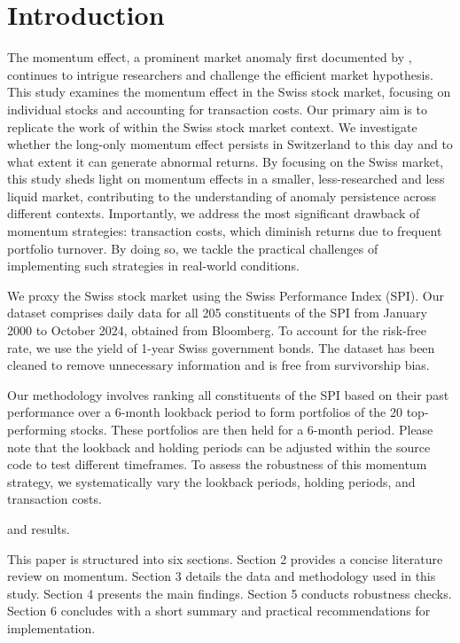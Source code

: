 \documentclass[a4paper,12pt]{article}
\begin{document}
\setcounter{page}{1}
\tableofcontents

\clearpage
\listoftables
\listoffigures
\clearpage


\setcounter{page}{1}
\section{Introduction}
The momentum effect, a prominent market anomaly first documented by \cite{jegatit1993}, continues to intrigue researchers and challenge the efficient market hypothesis. This study examines the momentum effect in the Swiss stock market, focusing on individual stocks and accounting for transaction costs. Our primary aim is to replicate the work of \cite{jegatit1993} within the Swiss stock market context. We investigate whether the long-only momentum effect persists in Switzerland to this day and to what extent it can generate abnormal returns. By focusing on the Swiss market, this study sheds light on momentum effects in a smaller, less-researched and less liquid market, contributing to the understanding of anomaly persistence across different contexts. Importantly, we address the most significant drawback of momentum strategies: transaction costs, which diminish returns due to frequent portfolio turnover. By doing so, we tackle the practical challenges of implementing such strategies in real-world conditions. 

We proxy the Swiss stock market using the Swiss Performance Index (SPI). Our dataset comprises daily data for all 205 constituents of the SPI from January 2000 to October 2024, obtained from Bloomberg. To account for the risk-free rate, we use the yield of 1-year Swiss government bonds. The dataset has been cleaned to remove unnecessary information and is free from survivorship bias. 

Our methodology involves ranking all constituents of the SPI based on their past performance over a 6-month lookback period to form portfolios of the 20 top-performing stocks. These portfolios are then held for a 6-month period. Please note that the lookback and holding periods can be adjusted within the source code to test different timeframes. To assess the robustness of this momentum strategy, we systematically vary the lookback periods, holding periods, and transaction costs.  

and results. 

This paper is structured into six sections. Section 2 provides a concise literature review on momentum. Section 3 details the data and methodology used in this study. Section 4 presents the main findings. Section 5 conducts robustness checks. Section 6 concludes with a short summary and practical recommendations for implementation.
\end{document}
